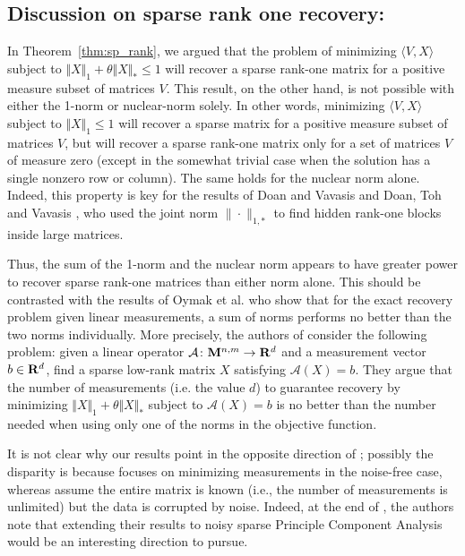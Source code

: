 \documentclass[smallextended,numbook]{svjour3}
\begin{document}
\subsection*{Discussion on sparse rank one recovery:}\label{sec:disc}
In Theorem~\ref{thm:sp_rank}, we argued that the problem of minimizing $\langle V, X\rangle$ subject to $\Vert X\Vert_1 + \theta \Vert X\Vert_*\le 1$ will
recover a sparse rank-one matrix for a positive measure subset of matrices $V$.  This result, on the other hand, is not possible with either the 1-norm or nuclear-norm solely.  In other words, minimizing
$\langle V, X \rangle$ subject to $\Vert X\Vert_1 \le 1$ will recover a sparse matrix
for a positive measure subset of matrices $V$, but will recover a
sparse rank-one matrix only for a set of matrices $V$ of measure zero (except in the somewhat trivial case when the solution has a single nonzero row or column).  The same holds for the nuclear norm alone.
Indeed, this property is key for the results of Doan and Vavasis \cite{DV13} and Doan, Toh and Vavasis \cite{prox_norm},  who used the joint norm $\| \cdot\|_{1,*}$ to find hidden rank-one blocks inside large matrices. 

Thus, the sum of the 1-norm and the nuclear norm appears to have greater power to recover sparse rank-one matrices than either norm alone.  This should be contrasted with the results of Oymak et al. \cite{Fazel_neg} who show that for the exact recovery problem given linear measurements, a sum of norms performs no better than the two norms individually.  More precisely, the authors of \cite{Fazel_neg} consider the following problem: given a linear operator $\mathcal{A}\colon {\bf M}^{n,m}\to{{\bf R}}^d$ and a measurement vector $b\in {{\bf R}}^d$, find a sparse low-rank matrix $X$ satisfying $\mathcal{A}(X)=b$.  They argue that the number of measurements (i.e. the value $d$) to guarantee recovery by minimizing $\Vert X\Vert_1 + \theta \Vert X\Vert_*$ subject to $\mathcal{A}(X)=b$ is no better than the number needed when using only one of the norms in the objective function.

It is not clear why our results point in the opposite direction of \cite{Fazel_neg}; possibly the disparity is because \cite{Fazel_neg} focuses on minimizing measurements in the noise-free case, whereas \cite{DV13,prox_norm} assume the entire matrix is known (i.e., the number of measurements is unlimited) but the data is corrupted by noise.  Indeed, at the end of \cite{Fazel_neg}, the authors note that extending their results to noisy sparse Principle Component Analysis would be an interesting direction to pursue.
\end{document}
